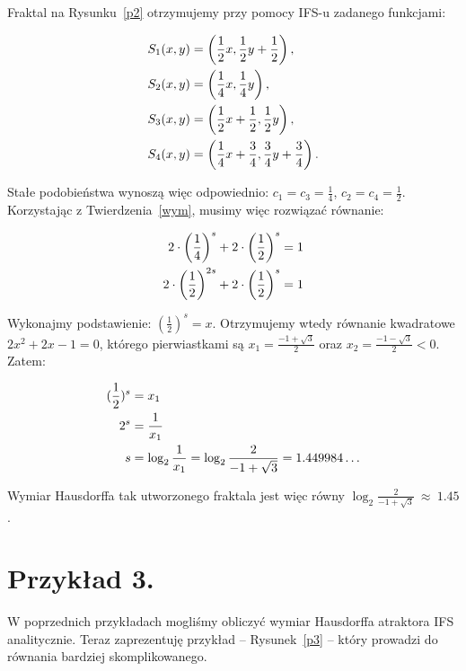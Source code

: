 \documentclass{mini}
\begin{document}
Fraktal na Rysunku~\ref{p2} otrzymujemy przy pomocy IFS-u zadanego funkcjami:

$$
\aligned
S_1(x,y)&=\left(\frac{1}{2}x,\frac{1}{2}y+\frac{1}{2}\right),\\
S_2(x,y)&=\left(\frac{1}{4}x,\frac{1}{4}y\right),\\
S_3(x,y)&=\left(\frac{1}{2}x+\frac{1}{2},\frac{1}{2}y\right),\\
S_4(x,y)&=\left(\frac{1}{4}x+\frac{3}{4},\frac{3}{4}y+\frac{3}{4}\right).\\
\endaligned
$$

Stałe podobieństwa wynoszą więc odpowiednio: $c_1=c_3=\frac{1}{4}$, $c_2=c_4=\frac{1}{2}$.
\newpage
Korzystając z Twierdzenia~\ref{wym}, musimy więc rozwiązać równanie:

$$
\aligned
2\cdot \left(\frac{1}{4}\right)^s+2\cdot\left(\frac{1}{2}\right)^s&=1\\
2\cdot \left(\frac{1}{2}\right)^{2s}+2\cdot\left(\frac{1}{2}\right)^s&=1 \\
\endaligned
$$

Wykonajmy podstawienie: $\left(\frac{1}{2}\right)^s=x$. Otrzymujemy wtedy równanie kwadratowe $2x^2+2x-1=0 $, którego pierwiastkami są $x_1=\frac{-1+\sqrt{3}}{2}$ oraz $x_2=\frac{-1-\sqrt{3}}{2}<0$.
Zatem:

$$
\aligned
(\frac{1}{2})^s&=x_1\\
2^s&=\frac{1}{x_1}\\
s&=\log_2 \frac{1}{x_1}=\log_2 \frac{2}{-1+\sqrt{3}}= 1.449984\ldots
\endaligned
$$

Wymiar Hausdorffa tak utworzonego fraktala jest więc równy $\log_2 \frac{2}{-1+\sqrt{3}}~\approx~1.45$.

\section{Przykład 3.}

W poprzednich przykładach mogliśmy obliczyć wymiar Hausdorffa atraktora IFS analitycznie. Teraz zaprezentuję przykład -- Rysunek~\ref{p3} -- który prowadzi do równania bardziej skomplikowanego. 
\end{document}
